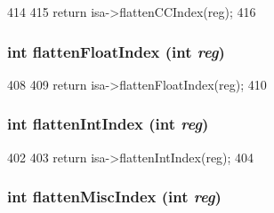 \begin{DoxyCode}
414     {
415         return isa->flattenCCIndex(reg);
416     }
\end{DoxyCode}
\hypertarget{classSimpleThread_ab9ea3f8f1a21df875c7273c7377dfac1}{
\subsubsection[{flattenFloatIndex}]{\setlength{\rightskip}{0pt plus 5cm}int flattenFloatIndex (int {\em reg})}}
\label{classSimpleThread_ab9ea3f8f1a21df875c7273c7377dfac1}



\begin{DoxyCode}
408     {
409         return isa->flattenFloatIndex(reg);
410     }
\end{DoxyCode}
\hypertarget{classSimpleThread_aa529f2d70520c578e3e29b3bf1a66312}{
\subsubsection[{flattenIntIndex}]{\setlength{\rightskip}{0pt plus 5cm}int flattenIntIndex (int {\em reg})}}
\label{classSimpleThread_aa529f2d70520c578e3e29b3bf1a66312}



\begin{DoxyCode}
402     {
403         return isa->flattenIntIndex(reg);
404     }
\end{DoxyCode}
\hypertarget{classSimpleThread_a5adc7d32f3a8bd75c5dc0a62d95564fd}{
\subsubsection[{flattenMiscIndex}]{\setlength{\rightskip}{0pt plus 5cm}int flattenMiscIndex (int {\em reg})}}
\label{classSimpleThread_a5adc7d32f3a8bd75c5dc0a62d95564fd}



